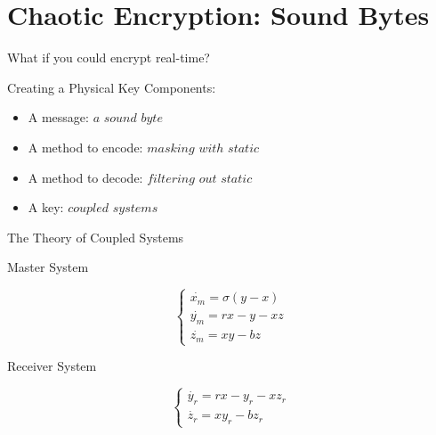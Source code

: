\section{Chaotic Encryption:  Sound Bytes}
    
    \frame{\sectionpage}
    
    \begin{frame}
        \centering
        What if you could encrypt real-time?
    \end{frame}
    
    \begin{frame}{Creating a Physical Key}
        \centering
        Components:
        \begin{itemize}
        	\item A message:  $a$ $sound$ $byte$
        	\item A method to encode:  $masking$ $with$ $static$
        	\item A method to decode:  $filtering$ $out$ $static$
        	\item A key:  $coupled$ $systems$
        \end{itemize}
    \end{frame}     
    
    \begin{frame}{The Theory of Coupled Systems}
        \begin{minipage}[b]{0.45\linewidth}
            \centering
            \caption{Master System}
            \label{lst}
            \begin{equation*}
                \begin{cases} 
                    \dot{x_{m}} = \sigma(y-x) \\ 
                    \dot{y_{m}} = rx - y - xz \\ 
                    \dot{z_{m}} = xy - bz
                \end{cases}
            \end{equation*}
        \end{minipage}
        \hspace{0.5cm}
        \begin{minipage}[b]{0.45\linewidth}
            \centering
            \caption{Receiver System}
            \label{lst}
            \begin{equation*}
                \begin{cases} 
                    \dot{y_{r}} = rx - y_{r} - xz_{r} \\ 
                    \dot{z_{r}} = xy_{r} - bz_{r}
                \end{cases}
            \end{equation*}
        \end{minipage}
    \end{frame}
    
